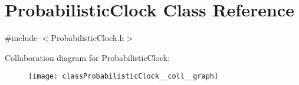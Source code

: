 \hypertarget{classProbabilisticClock}{}\section{Probabilistic\+Clock Class Reference}
\label{classProbabilisticClock}


{\ttfamily \#include $<$Probabilistic\+Clock.\+h$>$}



Collaboration diagram for Probabilistic\+Clock\+:\nopagebreak
\begin{figure}[H]
\begin{center}
\leavevmode
\texttt{[image: classProbabilisticClock\_\_coll\_\_graph]}
\end{center}
\end{figure}
